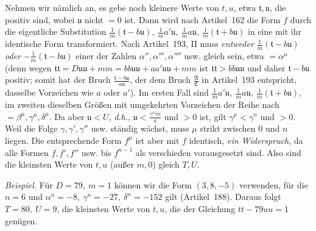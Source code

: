 Nehmen wir nämlich an, es gebe noch kleinere Werte von \(t,u\), etwa \(\mathfrak{t},\mathfrak{u}\), die positiv sind, wobei \(\mathfrak{u}\) nicht \(=0\) ist. Dann wird nach Artikel~162 die Form \(f\) durch die eigentliche Substitution \(\frac1m(\mathfrak{t}-b\mathfrak{u}),\ \frac1m a'\mathfrak{u},\ \frac1m a\mathfrak{u},\ \frac1m(\mathfrak{t}+b\mathfrak{u})\) in eine mit ihr
identische Form transformiert. Nach Artikel~193, II muss \textit{entweder} \(\frac1m(\mathfrak{t}-b\mathfrak{u})\) \textit{oder} \(-\frac1m(\mathfrak{t}-b\mathfrak{u})\) einer der Zahlen \(\alpha'',\alpha''',\alpha''''\) usw. gleich sein, etwa \(=\alpha^\mu\) (denn wegen \(\mathfrak{tt}=D\mathfrak{uu}+mm=bb\mathfrak{uu}+aa'\mathfrak{uu}+mm\) ist \(\mathfrak{tt}>bb\mathfrak{uu}\) und daher \(\mathfrak{t}-b\mathfrak{u}\) positiv; somit hat der Bruch \(\frac{\mathfrak{t}-b\mathfrak{u}}{a\mathfrak{u}}\), der dem Bruch \(\frac{\mathfrak{A}}{\mathfrak{C}}\) in Artikel~193 entspricht, dasselbe Vorzeichen wie \(a\) oder \(a'\)). Im ersten Fall sind \(\frac1m a'\mathfrak{u},\ \frac1m a\mathfrak{u},\ \frac1m(\mathfrak{t}+b\mathfrak{u})\), im zweiten dieselben Größen mit umgekehrten Vorzeichen der Reihe nach \(=\beta^\mu,\gamma^\mu,\delta^\mu\). Da aber \(\mathfrak{u}<U\), \textit{d.h.}, \(\mathfrak{u}<\frac{\gamma^n m}{a}\) und \(>0\) ist, gilt \(\gamma^\mu<\gamma^n\) und \(>0\). Weil die Folge \(\gamma,\gamma',\gamma''\) usw. ständig wächst, muss \(\mu\) strikt zwischen \(0\) und \(n\) liegen. Die entsprechende Form \(f^\mu\) ist aber mit \(f\) identisch, \textit{ein Widerspruch}, da alle Formen \(f,f',f''\) usw. bis \(f^{n-1}\) als verschieden vorausgesetzt sind. Also sind die kleinsten Werte von \(t,u\) (außer \(m,0\)) gleich \(T,U\).

\textit{Beispiel.} Für \(D=79,\ m=1\) können wir die Form \((3,8,-5)\) verwenden, für die \(n=6\) und \(\alpha^n=-8,\ \gamma^n=-27,\ \delta^n=-152\) gilt (Artikel~188). Daraus folgt \(T=80,\ U=9\), die kleinsten Werte von \(t,u\), die der Gleichung \(tt-79uu=1\) genügen.

